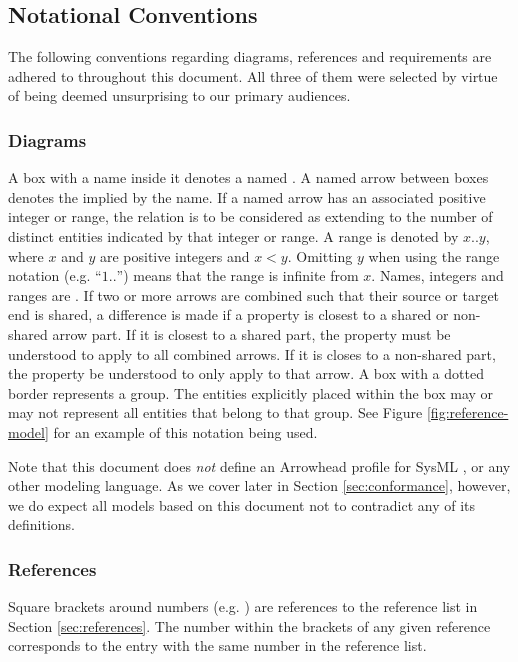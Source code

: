 \subsection{Notational Conventions}
\label{sec:introduction:conventions}

The following conventions regarding diagrams, references and requirements are adhered to throughout this document.
All three of them were selected by virtue of being deemed unsurprising to our primary audiences.

\subsubsection{Diagrams}

A box with a name inside it denotes a named .
A named arrow between boxes denotes the  implied by the name.
If a named arrow has an associated positive integer or range, the relation is to be considered as extending to the number of distinct entities indicated by that integer or range.
A range is denoted by $x..y$, where $x$ and $y$ are positive integers and $x<y$.
Omitting $y$ when using the range notation (e.g. ``$1..$'') means that the range is infinite from $x$.
Names, integers and ranges are .
If two or more arrows are combined such that their source or target end is shared, a difference is made if a property is closest to a shared or non-shared arrow part.
If it is closest to a shared part, the property must be understood to apply to all combined arrows.
If it is closes to a non-shared part, the property be understood to only apply to that arrow.
A box with a dotted border represents a group.
The entities explicitly placed within the box may or may not represent all entities that belong to that group.
See Figure \ref{fig:reference-model} for an example of this notation being used.

Note that this document does \textit{not} define an Arrowhead profile for SysML \cite{omg2019sysml}, or any other modeling language.
As we cover later in Section \ref{sec:conformance}, however, we do expect all models based on this document not to contradict any of its definitions.

\subsubsection{References}

Square brackets around numbers (e.g. \cite{delsing2017iot}) are references to the reference list in Section \ref{sec:references}.
The number within the brackets of any given reference corresponds to the entry with the same number in the reference list.

